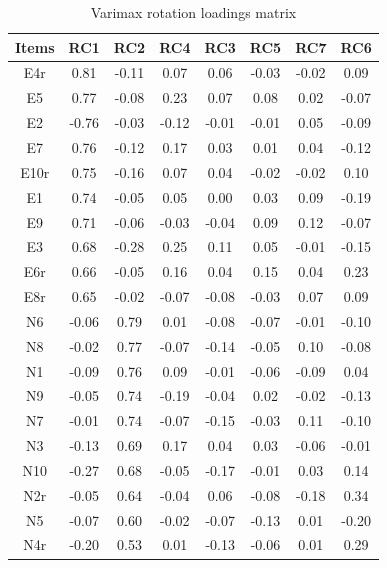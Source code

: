\documentclass[
  english,
  man, fleqn, noextraspace]{apa6}
\begin{document}
\begin{table}[tbp]

\begin{center}
\begin{threeparttable}

\caption{\label{tab:varimaxTable}Varimax rotation loadings matrix}

\tiny{

\begin{tabular}{cccccccc}
\toprule
Items & \multicolumn{1}{c}{RC1} & \multicolumn{1}{c}{RC2} & \multicolumn{1}{c}{RC4} & \multicolumn{1}{c}{RC3} & \multicolumn{1}{c}{RC5} & \multicolumn{1}{c}{RC7} & \multicolumn{1}{c}{RC6}\\
\midrule
E4r & 0.81 & -0.11 & 0.07 & 0.06 & -0.03 & -0.02 & 0.09\\
E5 & 0.77 & -0.08 & 0.23 & 0.07 & 0.08 & 0.02 & -0.07\\
E2 & -0.76 & -0.03 & -0.12 & -0.01 & -0.01 & 0.05 & -0.09\\
E7 & 0.76 & -0.12 & 0.17 & 0.03 & 0.01 & 0.04 & -0.12\\
E10r & 0.75 & -0.16 & 0.07 & 0.04 & -0.02 & -0.02 & 0.10\\
E1 & 0.74 & -0.05 & 0.05 & 0.00 & 0.03 & 0.09 & -0.19\\
E9 & 0.71 & -0.06 & -0.03 & -0.04 & 0.09 & 0.12 & -0.07\\
E3 & 0.68 & -0.28 & 0.25 & 0.11 & 0.05 & -0.01 & -0.15\\
E6r & 0.66 & -0.05 & 0.16 & 0.04 & 0.15 & 0.04 & 0.23\\
E8r & 0.65 & -0.02 & -0.07 & -0.08 & -0.03 & 0.07 & 0.09\\
N6 & -0.06 & 0.79 & 0.01 & -0.08 & -0.07 & -0.01 & -0.10\\
N8 & -0.02 & 0.77 & -0.07 & -0.14 & -0.05 & 0.10 & -0.08\\
N1 & -0.09 & 0.76 & 0.09 & -0.01 & -0.06 & -0.09 & 0.04\\
N9 & -0.05 & 0.74 & -0.19 & -0.04 & 0.02 & -0.02 & -0.13\\
N7 & -0.01 & 0.74 & -0.07 & -0.15 & -0.03 & 0.11 & -0.10\\
N3 & -0.13 & 0.69 & 0.17 & 0.04 & 0.03 & -0.06 & -0.01\\
N10 & -0.27 & 0.68 & -0.05 & -0.17 & -0.01 & 0.03 & 0.14\\
N2r & -0.05 & 0.64 & -0.04 & 0.06 & -0.08 & -0.18 & 0.34\\
N5 & -0.07 & 0.60 & -0.02 & -0.07 & -0.13 & 0.01 & -0.20\\
N4r & -0.20 & 0.53 & 0.01 & -0.13 & -0.06 & 0.01 & 0.29\\

\end{tabular}}
\end{threeparttable}
\end{center}
\end{table}
\end{document}
